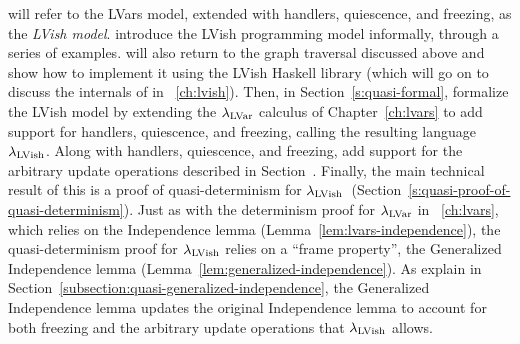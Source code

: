  will refer to the LVars model, extended with handlers, quiescence,
and freezing, as the \emph{LVish model}.   introduce
the LVish programming model informally, through a series of examples.
 will also return to the graph traversal  discussed above and show
how to implement it using the LVish Haskell library (which  will go
on to discuss the internals of in ~\ref{ch:lvish}).  Then, in
Section~\ref{s:quasi-formal},  formalize the LVish model by extending
the $\lambda_{\textrm{LVar}}$ calculus of Chapter~\ref{ch:lvars} to add support
for handlers, quiescence, and freezing, calling the resulting language
$\lambda_{\textrm{LVish}}$.  Along with handlers, quiescence, and freezing,  add
support for the arbitrary update operations described in
Section~\either{\ref{subsection:lvars-generalizing-from-least-upper-bound-writes}}{\ref{s:lvars-generalizing}}.
Finally, the main technical result of this  is a proof of
quasi-determinism for
$\lambda_{\textrm{LVish}}$~(Section~\ref{s:quasi-proof-of-quasi-determinism}). Just
as with the determinism proof  for $\lambda_{\textrm{LVar}}$ in
~\ref{ch:lvars}, which relies on the Independence lemma
(Lemma~\ref{lem:lvars-independence}), the quasi-determinism proof for
$\lambda_{\textrm{LVish}}$ relies on a ``frame property'', the Generalized
Independence lemma (Lemma~\ref{lem:generalized-independence}).  As 
explain in Section~\ref{subsection:quasi-generalized-independence},
the Generalized Independence lemma updates the original Independence
lemma to account for both freezing and the arbitrary update operations
that $\lambda_{\textrm{LVish}}$ allows.
